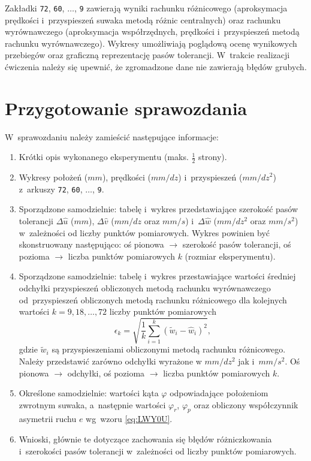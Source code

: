 \documentclass[paper=a4,DIV=12]{tmmlab}
\begin{document}
Zakładki \texttt{72}, \texttt{60}, $\dots$, \texttt{9} zawierają wyniki
rachunku różnicowego (aproksymacja prędkości i~przyspieszeń suwaka metodą
różnic centralnych) oraz rachunku wyrównawczego (aproksymacja współrzędnych,
prędkości i~przyspieszeń metodą rachunku wyrównawczego). Wykresy umożliwiają
poglądową ocenę wynikowych przebiegów oraz graficzną reprezentację pasów
tolerancji. W~trakcie realizacji ćwiczenia należy się upewnić, że zgromadzone
dane nie zawierają błędów grubych.

\section{Przygotowanie sprawozdania}
\label{sec:FW8Q8}

W~sprawozdaniu należy zamieścić następujące informacje:
\begin{enumerate}
  \item Krótki opis wykonanego eksperymentu (maks. $\tfrac{1}{2}$ strony).
  \item Wykresy położeń ($mm$), prędkości ($mm/dz$) i~przyspieszeń
    ($mm/{dz}^2$) z~arkuszy \texttt{72}, \texttt{60}, $\dots$, \texttt{9}.
  \item Sporządzone samodzielnie: tabelę i~wykres przedstawiające szerokość
    pasów tolerancji $\Delta\hat{u}$ ($mm$), $\Delta\hat{v}$ ($mm/dz$ oraz
    $mm/s$) i~$\Delta\hat{w}$ ($mm/dz^2$ oraz $mm/s^2$) w~zależności od liczby
    punktów pomiarowych. Wykres powinien być skonstruowany następująco: oś
    pionowa $\rightarrow$ szerokość pasów tolerancji, oś pozioma
    $\rightarrow$ liczba punktów pomiarowych  $k$ (rozmiar eksperymentu).
  \item Sporządzone samodzielnie: tabelę i~wykres przestawiające wartości
    średniej odchyłki przyspieszeń obliczonych metodą rachunku wyrównawczego
    od~przyspieszeń obliczonych metodą rachunku różnicowego dla kolejnych
    wartości $k = 9, 18, \dots, 72$ liczby punktów pomiarowych
    \begin{equation}
      \epsilon_k = \sqrt{\frac{1}{k} \sum_{i=1}^k\left(\tilde{w}_i - \hat{w}_i\right)^2},
      \label{eq:INWGT}
    \end{equation}
    gdzie $\tilde{w}_i$ są przyspieszeniami obliczonymi metodą rachunku
    różnicowego. Należy przedstawić zarówno odchyłki wyrażone w $mm/dz^2$ jak
    i~$mm/s^2$. Oś pionowa $\rightarrow$ odchyłki, oś pozioma $\rightarrow$
    liczba punktów pomiarowych $k$.
  \item Określone samodzielnie: wartości kąta $\varphi$ odpowiadające
    położeniom zwrotnym suwaka, a~następnie wartości $\varphi_r$, $\varphi_p$
    oraz obliczony współczynnik asymetrii ruchu $e$
    wg~wzoru \eqref{eq:LWY0U}.
  \item Wnioski, głównie te dotyczące zachowania się błędów różniczkowania
    i~szerokości pasów tolerancji w~zależności od liczby punktów pomiarowych.
\end{enumerate}
\end{document}
